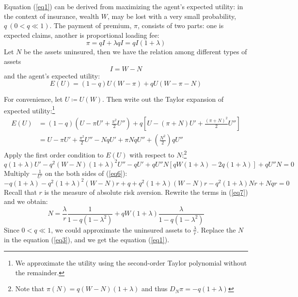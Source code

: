 \documentclass[11pt, a4paper, leqno]{article}
\begin{document}
Equation (\ref{eq1}) can be derived from maximizing the agent's expected utility: in the context of insurance, wealth $W$, may be lost with a very small probability, $q\ (0<q\ll1)$. The payment of premium, $\pi$, consists of two parts: one is expected claims, another is proportional loading fee:
\begin{equation}
\pi = qI + \lambda qI =qI(1 + \lambda)
\end{equation}
Let $N$ be the assets uninsured, then we have the relation among different types of assets
\begin{equation}\label{eq3}
I = W - N
\end{equation}
and the agent's expected utility:
\begin{equation}
E(U) = (1-q)U(W-\pi)+qU(W-\pi-N)
\end{equation}

For convenience, let $U\coloneqq U(W)$. Then write out the Taylor expansion of expected utility:\footnote{We approximate the utility using the second-order Taylor polynomial without the remainder.}
\begin{equation}
\begin{aligned}
E(U)&=(1-q)(U-\pi U'+\frac{\pi^{2}}{2}U'')+q[U-(\pi +N)U'+\frac{(\pi+N)^{2}}{2}U'']\\
    &=U-\pi U'+\frac{\pi^{2}}{2}U''-NqU'+\pi NqU''+(\frac{N^{2}}{2})qU''
\end{aligned}
\end{equation}
Apply the first order condition to $E(U)$ with respect to $N$:\footnote{Note that $\pi(N)=q(W-N)(1+\lambda)$ and thus $D_{N}\pi=-q(1+\lambda)$}
\begin{equation}\label{eq6}
q(1+\lambda)U'-q^{2}(W-N)(1+\lambda)^{2}U''-qU'+qU''N[qW(1+\lambda)-2q(1+\lambda)]+qU''N=0
\end{equation}
Multiply $-\frac{1}{U'}$ on the both sides of (\ref{eq6}):
\begin{equation}\label{eq7}
-q(1+\lambda)-q^{2}(1+\lambda)^{2}(W-N)r+q+q^{2}(1+\lambda)(W-N)r-q^{2}(1+\lambda)Nr+Nqr=0
\end{equation}
Recall that $r$ is the measure of absolute risk aversion. Rewrite the terms in (\ref{eq7}) and we obtain:
\begin{equation}
N=\frac{\lambda}{r}\frac{1}{1-q(1-\lambda^{2})}+qW(1+\lambda)\frac{\lambda}{1-q(1-\lambda^{2})}
\end{equation}
Since $0<q\ll1$, we could approximate the uninsured assets to $\frac{\lambda}{r}$. Replace the $N$ in the equation (\ref{eq3}), and we get the equation (\ref{eq1}).
\end{document}
